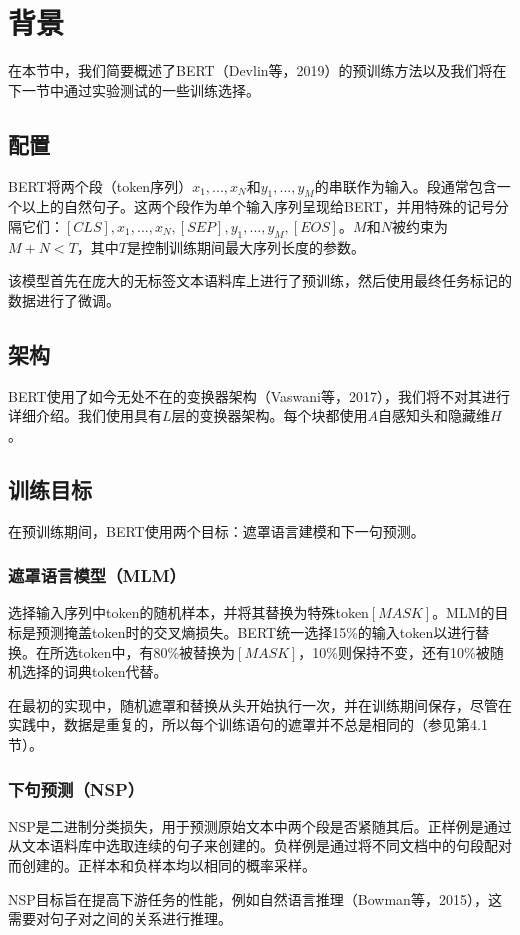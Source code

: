 \documentclass[lang=cn,11pt,a4paper,twocolumn]{elegantpaper}
\begin{document}
\section{背景}
在本节中，我们简要概述了BERT（Devlin等，2019）的预训练方法以及我们将在下一节中通过实验测试的一些训练选择。
\subsection{配置}
BERT将两个段（token序列）$x_1,...,x_N$和$y_1,...,y_M$的串联作为输入。段通常包含一个以上的自然句子。这两个段作为单个输入序列呈现给BERT，并用特殊的记号分隔它们：$[CLS],x_1,...,x_N,[SEP],y_1,...,y_M,[EOS]$。$M$和$N$被约束为$M+N<T$，其中$T$是控制训练期间最大序列长度的参数。

该模型首先在庞大的无标签文本语料库上进行了预训练，然后使用最终任务标记的数据进行了微调。

\subsection{架构}
BERT使用了如今无处不在的变换器架构（Vaswani等，2017），我们将不对其进行详细介绍。我们使用具有$L$层的变换器架构。每个块都使用$A$自感知头和隐藏维$H$。

\subsection{训练目标}
在预训练期间，BERT使用两个目标：遮罩语言建模和下一句预测。
\subsubsection{遮罩语言模型（MLM）}
选择输入序列中token的随机样本，并将其替换为特殊token$[MASK]$。MLM的目标是预测掩盖token时的交叉熵损失。BERT统一选择15\%的输入token以进行替换。在所选token中，有80\%被替换为$[MASK]$，10\%则保持不变，还有10\%被随机选择的词典token代替。

在最初的实现中，随机遮罩和替换从头开始执行一次，并在训练期间保存，尽管在实践中，数据是重复的，所以每个训练语句的遮罩并不总是相同的（参见第4.1节）。
\subsubsection{下句预测（NSP）}
NSP是二进制分类损失，用于预测原始文本中两个段是否紧随其后。正样例是通过从文本语料库中选取连续的句子来创建的。负样例是通过将不同文档中的句段配对而创建的。正样本和负样本均以相同的概率采样。

NSP目标旨在提高下游任务的性能，例如自然语言推理（Bowman等，2015），这需要对句子对之间的关系进行推理。
\end{document}
